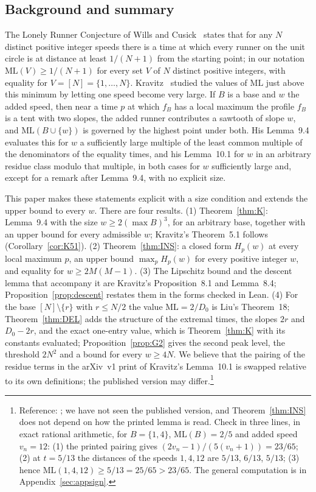\documentclass[11pt]{article}
\theoremstyle{definition}
\theoremstyle{remark}
\newcommand{\ML}{\mathrm{ML}}
\begin{document}
\subsection{Background and summary}
The Lonely Runner Conjecture of Wills and Cusick~\cite{W} states that for any $N$ distinct positive integer speeds there is a time at which every runner on the unit circle is at distance at least $1/(N+1)$ from the starting point; in our notation $\ML(V)\ge1/(N+1)$ for every set $V$ of $N$ distinct positive integers, with equality for $V=[N]=\{1,\dots,N\}$. Kravitz~\cite{K} studied the values of $\ML$ just above this minimum by letting one speed become very large. If $B$ is a base and $w$ the added speed, then near a time $p$ at which $f_B$ has a local maximum the profile $f_B$ is a tent with two slopes, the added runner contributes a sawtooth of slope $w$, and $\ML(B\cup\{w\})$ is governed by the highest point under both. His Lemma~9.4 evaluates this for $w$ a sufficiently large multiple of the least common multiple of the denominators of the equality times, and his Lemma~10.1 for $w$ in an arbitrary residue class modulo that multiple, in both cases for $w$ sufficiently large and, except for a remark after Lemma~9.4, with no explicit size.

This paper makes these statements explicit with a size condition and extends the upper bound to every $w$. There are four results. (1) Theorem~\ref{thm:K}: Lemma~9.4 with the size $w\ge2(\max B)^3$, for an arbitrary base, together with an upper bound for every admissible $w$; Kravitz's Theorem~5.1 follows (Corollary~\ref{cor:K51}). (2) Theorem~\ref{thm:INS}: a closed form $H_p(w)$ at every local maximum $p$, an upper bound $\max_pH_p(w)$ for every positive integer $w$, and equality for $w\ge2M(M-1)$. (3) The Lipschitz bound and the descent lemma that accompany it are Kravitz's Proposition~8.1 and Lemma~8.4; Proposition~\ref{prop:descent} restates them in the forms checked in Lean. (4) For the base $[N]\setminus\{r\}$ with $r\le N/2$ the value $\ML=2/D_0$ is Liu's Theorem~18; Theorem~\ref{thm:DEL} adds the structure of the extremal times, the slopes $2r$ and $D_0-2r$, and the exact one-entry value, which is Theorem~\ref{thm:K} with its constants evaluated; Proposition~\ref{prop:G2} gives the second peak level, the threshold $2N^2$ and a bound for every $w\ge4N$. We believe that the pairing of the residue terms in the arXiv~v1 print of Kravitz's Lemma~10.1 is swapped relative to its own definitions; the published version may differ.\footnote{Reference: \cite[p.~19]{K}; we have not seen the published version, and Theorem~\ref{thm:INS} does not depend on how the printed lemma is read. Check in three lines, in exact rational arithmetic, for $B=\{1,4\}$, $\ML(B)=2/5$ and added speed $v_n=12$: (1) the printed pairing gives $(2v_n-1)/(5(v_n+1))=23/65$; (2) at $t=5/13$ the distances of the speeds $1,4,12$ are $5/13$, $6/13$, $5/13$; (3) hence $\ML(1,4,12)\ge5/13=25/65>23/65$. The general computation is in Appendix~\ref{sec:appsign}.}
\end{document}
